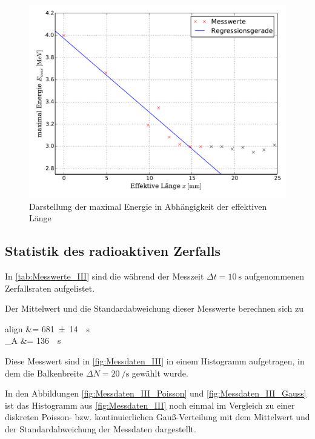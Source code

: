 	\begin{figure}[!h]
		\centering
		\includegraphics[scale=0.7]{Grafiken/EnergieVerlauf.pdf}
		\caption{Darstellung der maximal Energie in Abhängigkeit der effektiven Länge}
		\label{fig:Messdaten_II_Energie}
	\end{figure}
	

\subsection{Statistik des radioaktiven Zerfalls}\label{sec:Messung_III}
	
	In \cref{tab:Messwerte_III} sind die  während der Messzeit 
	$\Delta t = \SI{10}{\second}$ aufgenommenen Zerfallsraten aufgelistet.
	
	Der Mittelwert und die Standardabweichung dieser Messwerte berechnen sich zu
	\begin{empheq}{align}
		 &= \SI{681(14)}{\per\second}\\
		\sigma_{A} &= \SI{136}{\per\second}\\
	\end{empheq}
	
	Diese Messwert sind in \cref{fig:Messdaten_III} in einem Histogramm aufgetragen,
	in dem die Balkenbreite $\Delta N = \SI{20}{\per\second}$ gewählt wurde.
	
	In den Abbildungen \ref{fig:Messdaten_III_Poisson} und \ref{fig:Messdaten_III_Gauss}
	ist das Histogramm aus \cref{fig:Messdaten_III} noch einmal im Vergleich zu einer 
	diskreten Poisson- bzw. kontinuierlichen Gauß-Verteilung mit dem Mittelwert und der 
	Standardabweichung der Messdaten dargestellt.
	

